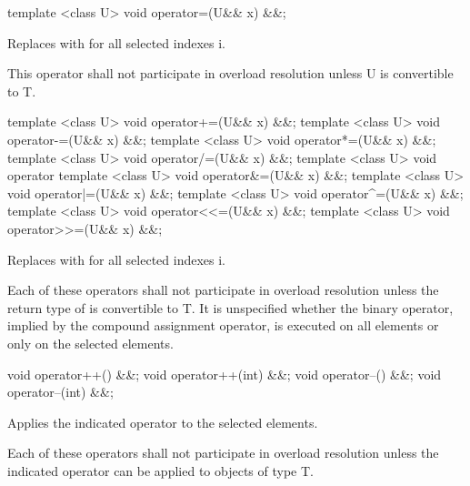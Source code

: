 \begin{itemdecl}
template <class U> void operator=(U&& x) &&;
\end{itemdecl}
\begin{itemdescr}
  \pnum\effects
  Replaces  with  for all selected indexes \code i.

  \pnum\remarks This operator shall not participate in overload resolution unless \type U is convertible to \type T.
\end{itemdescr}

\begin{itemdecl}
template <class U> void operator+=(U&& x) &&;
template <class U> void operator-=(U&& x) &&;
template <class U> void operator*=(U&& x) &&;
template <class U> void operator/=(U&& x) &&;
template <class U> void operator%
template <class U> void operator&=(U&& x) &&;
template <class U> void operator|=(U&& x) &&;
template <class U> void operator^=(U&& x) &&;
template <class U> void operator<<=(U&& x) &&;
template <class U> void operator>>=(U&& x) &&;
\end{itemdecl}
\begin{itemdescr}
  \pnum\effects
  Replaces  with  for all selected indexes \code i.

  \pnum\remarks Each of these operators shall not participate in overload resolution unless
  the return type of  is convertible to \type T.
  It is unspecified whether the binary operator, implied by the compound assignment operator, is executed on all elements or only on the selected elements.
\end{itemdescr}

\begin{itemdecl}
void operator++() &&;
void operator++(int) &&;
void operator--() &&;
void operator--(int) &&;
\end{itemdecl}
\begin{itemdescr}
  \pnum\effects Applies the indicated operator to the selected elements.

  \pnum\remarks Each of these operators shall not participate in overload resolution unless the indicated operator can be applied to objects of type \type T.
\end{itemdescr}

